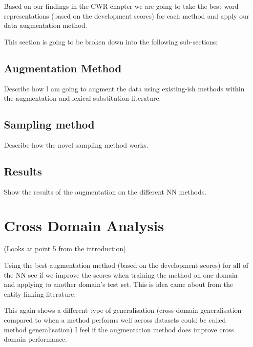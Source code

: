 Based on our findings in the CWR chapter we are going to take the best word representations (based on the development scores) for each method and apply our data augmentation method.

This section is going to be broken down into the following sub-sections:
\subsection{Augmentation Method}
Describe how I am going to augment the data using existing-ish methods within the augmentation and lexical substitution literature.
\subsection{Sampling method}
Describe how the novel sampling method works.
\subsection{Results}
Show the results of the augmentation on the different NN methods.
\section{Cross Domain Analysis}
(Looks at point 5 from the introduction)

Using the best augmentation method (based on the development scores) for all of the NN see if we improve the scores when training the method on one domain and applying to another domain's test set. This is idea came about from the entity linking literature.

This again shows a different type of generalisation (cross domain generalisation compared to when a method performs well across datasets could be called method generalisation) I feel if the augmentation method does improve cross domain performance.